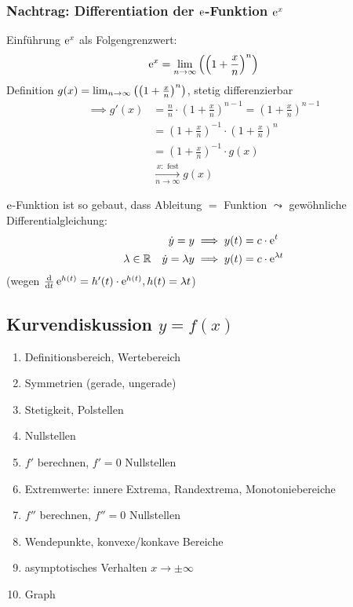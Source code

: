 \subsubsection*{Nachtrag: Differentiation der $\operatorname{e}$-Funktion $\operatorname{e}^x$}

Einführung $\operatorname{e}^x$ als Folgengrenzwert:
\begin{equation*}
  \operatorname{e}^x = \lim_{n \rightarrow \infty} \left( \left( 1+\frac x n\right)^n \right)
\end{equation*}
Definition $g(x) = \lim_{n \rightarrow \infty} \left( \left( 1+\frac x n\right)^n \right)$, stetig differenzierbar
\begin{align*}
  \implies g'(x) &= \frac n n \cdot \left( 1+\frac x n\right)^{n-1} = \left( 1+\frac x n\right)^{n-1} \\
  &= \left( 1+\frac x n\right)^{-1}\cdot \left( 1+\frac x n\right)^{n} \\
  &= \left( 1+\frac x n\right)^{-1}\cdot g(x) \\
  &\xrightarrow[n \rightarrow \infty]{x: \text{ fest}} g(x)
\end{align*}

\begin{note}
  $\operatorname{e}$-Funktion ist so gebaut, dass Ableitung $=$ Funktion $\leadsto$ gewöhnliche Differentialgleichung:
  \begin{align*}
    \dot y = y &\implies y(t) = c\cdot \operatorname{e}^t \\
    \lambda \in \mathbb R\quad \dot y = \lambda y &\implies y(t) = c \cdot \operatorname{e}^{\lambda t}
  \end{align*}
  (wegen $\frac{\mathrm d}{\mathrm d t} \operatorname{e}^{h(t)} = h'(t)\cdot\operatorname{e}^{h(t)}, h(t) = \lambda t$)

\end{note}

\subsection{Kurvendiskussion $y = f(x)$}

\begin{enumerate}
  \item Definitionsbereich, Wertebereich
  \item Symmetrien (gerade, ungerade)
  \item Stetigkeit, Polstellen
  \item Nullstellen%
  \item $f'$ berechnen, $f' = 0$ Nullstellen
  \item Extremwerte: innere Extrema, Randextrema, Monotoniebereiche
  \item $f''$ berechnen, $f'' = 0$ Nullstellen
  \item Wendepunkte, konvexe/konkave Bereiche
  \item asymptotisches Verhalten $x \rightarrow \pm\infty$
  \item Graph
\end{enumerate}

